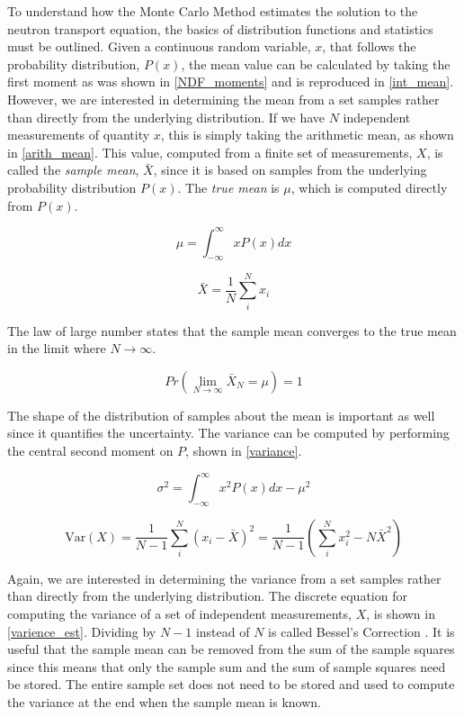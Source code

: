 To understand how the Monte Carlo Method estimates the solution to the neutron transport equation, the basics of distribution functions and statistics must be outlined.  Given a continuous random variable, $x$, that follows the probability distribution, $P(x)$, the mean value can be calculated by taking the first moment as was shown in \eqref{NDF_moments} and is reproduced in \eqref{int_mean}.  However, we are interested in determining the mean from a set samples rather than directly from the underlying distribution.  If we have $N$ independent measurements of quantity $x$, this is simply taking the arithmetic mean, as shown in \eqref{arith_mean}.  This value, computed from a finite set of measurements, $X$, is called the \emph{sample mean}, $\bar{X}$, since it is based on samples from the underlying probability distribution $P(x)$.  The \emph{true mean} is $\mu$, which is computed directly from $P(x)$.

\begin{equation}
\label{int_mean}
\mu = \int_{-\infty}^{\infty} x P(x) dx
\end{equation}

\begin{equation}
\label{arith_mean}
\bar{X} = \frac{1}{N} \sum_i^N x_i
\end{equation}

The law of large number states that the sample mean converges to the true mean in the limit where $N\rightarrow\infty$.  

\begin{equation}
\label{LLN}
Pr\left(\lim_{N\rightarrow\infty} \bar{X}_N = \mu \right) = 1
\end{equation}

The shape of the distribution of samples about the mean is important as well since it quantifies the uncertainty.  The variance can be computed by performing the central second moment on $P$, shown in \eqref{variance}. 

\begin{equation}
\label{variance}
\sigma^2 = \int_{-\infty}^{\infty} x^2 P(x) dx- \mu^2 
\end{equation}

\begin{equation}
\label{varience_est}
\mathrm{Var}(X)  =  \frac{1}{N-1} \sum_i^N (x_i-\bar{X})^2 =  \frac{1}{N-1} \left( \sum_i^N x_i^2-N\bar{X}^2 \right)
\end{equation}

Again, we are interested in determining the variance from a set samples rather than directly from the underlying distribution.  The discrete equation for computing the variance of a set of independent measurements, $X$, is shown in \eqref{varience_est}.  Dividing by $N-1$ instead of $N$ is called Bessel's Correction \cite{openmc}.  It is useful that the sample mean can be removed from the sum of the sample squares since this means that only the sample sum and the sum of sample squares need be stored.  The entire sample set does not need to be stored and used to compute the variance at the end when the sample mean is known.


